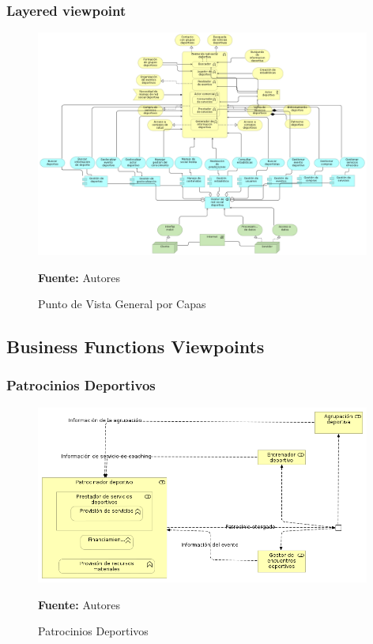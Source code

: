 \subsubsection{Layered viewpoint}

\begin{figure}[!htb]
  \begin{center}
    \includegraphics[width=11cm]{./imagenes/generallayered.png}
    \caption{Punto de Vista General por Capas}
    \label{fig:general_layered}
    \textbf{Fuente:}  Autores
  \end{center}
\end{figure}

\subsection{Business Functions Viewpoints}

\subsubsection{Patrocinios Deportivos}

\begin{figure}[!htb]
  \begin{center}
    \includegraphics[width=11cm]{./imagenes/business_functions/patrociniosdeportivos.png}
    \caption{Patrocinios Deportivos}
    \label{fig:bf_patrocinios_deportivos}
    \textbf{Fuente:}  Autores
  \end{center}
\end{figure}

